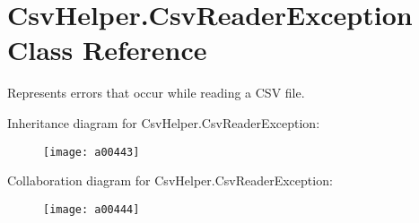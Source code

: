 \hypertarget{a00080}{\section{Csv\-Helper.\-Csv\-Reader\-Exception Class Reference}
\label{a00080}
}


Represents errors that occur while reading a C\-S\-V file.  




Inheritance diagram for Csv\-Helper.\-Csv\-Reader\-Exception\-:
\nopagebreak
\begin{figure}[H]
\begin{center}
\leavevmode
\texttt{[image: a00443]}
\end{center}
\end{figure}


Collaboration diagram for Csv\-Helper.\-Csv\-Reader\-Exception\-:
\nopagebreak
\begin{figure}[H]
\begin{center}
\leavevmode
\texttt{[image: a00444]}
\end{center}
\end{figure}
